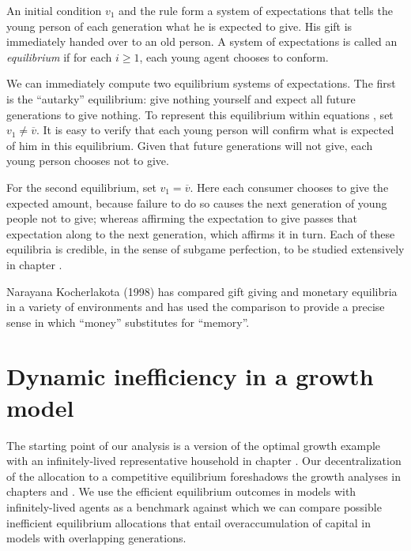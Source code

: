   An initial condition $v_1$ and the rule  form a system
of expectations that tells the young person of each generation
what he is  expected to give.  His gift is  immediately handed over
to an old person.
A system of expectations is called an {\it equilibrium}
if for each $i \geq 1$, each young   agent chooses
to conform.

  We can immediately compute two equilibrium systems of
expectations.  The first  is
the ``autarky'' equilibrium: give nothing yourself and
expect  all future generations to give nothing. To  represent
this equilibrium within equations , set $v_1 \neq \overline v$.
It is easy to verify that each young person will
confirm what is expected of him in this equilibrium.
Given that future generations will not give,  each young
person chooses not to give.

  For the second equilibrium, set $v_1 = \overline v$.   Here
each consumer chooses to give the expected amount, because
failure to do so causes  the next generation of
young people not to give; whereas affirming the expectation
to give passes that expectation along to the next generation,
which affirms it in turn.
Each of these equilibria is credible, in the sense
of subgame perfection, to be studied extensively in chapter
.


 Narayana Kocherlakota (1998) has  compared gift giving and monetary
equilibria in a variety of environments and has used the comparison to
provide a  precise sense in which ``money'' substitutes for ``memory''.




\section{Dynamic inefficiency in a growth model}
The starting point of our analysis is a version of the optimal 
growth example with an infinitely-lived representative household 
in chapter . Our decentralization of the allocation 
to a competitive equilibrium foreshadows the growth analyses
in chapters  and . We use the 
efficient equilibrium outcomes in models with infinitely-lived 
agents as a benchmark against which we can compare possible 
inefficient equilibrium
allocations that  entail overaccumulation of capital
in models with overlapping generations.


